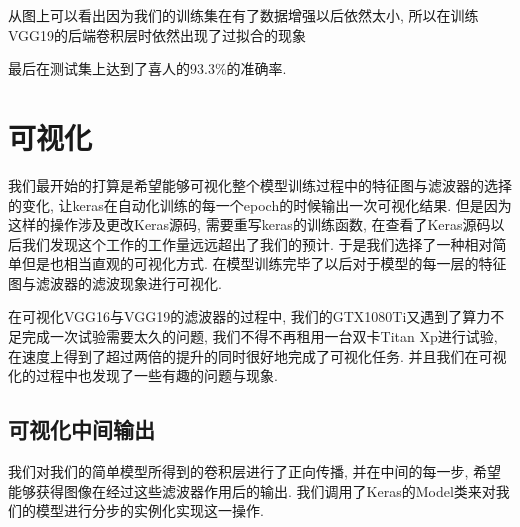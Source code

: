 \documentclass[lang=cn,11pt]{elegantpaper}
\begin{document}

从图上可以看出因为我们的训练集在有了数据增强以后依然太小, 所以在训练VGG19的后端卷积层时依然出现了过拟合的现象

最后在测试集上达到了喜人的93.3\%的准确率.





\section{可视化}

我们最开始的打算是希望能够可视化整个模型训练过程中的特征图与滤波器的选择的变化, 让keras在自动化训练的每一个epoch的时候输出一次可视化结果. 但是因为这样的操作涉及更改Keras源码, 需要重写keras的训练函数, 在查看了Keras源码以后我们发现这个工作的工作量远远超出了我们的预计. 于是我们选择了一种相对简单但是也相当直观的可视化方式. 在模型训练完毕了以后对于模型的每一层的特征图与滤波器的滤波现象进行可视化.

在可视化VGG16与VGG19的滤波器的过程中, 我们的GTX1080Ti又遇到了算力不足完成一次试验需要太久的问题, 我们不得不再租用一台双卡Titan Xp进行试验, 在速度上得到了超过两倍的提升的同时很好地完成了可视化任务. 并且我们在可视化的过程中也发现了一些有趣的问题与现象.



\subsection{可视化中间输出}

我们对我们的简单模型所得到的卷积层进行了正向传播, 并在中间的每一步, 希望能够获得图像在经过这些滤波器作用后的输出. 我们调用了Keras的Model类来对我们的模型进行分步的实例化实现这一操作.
\end{document}
